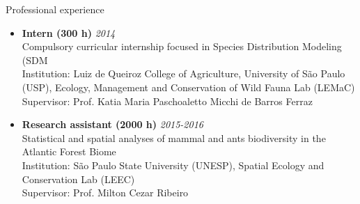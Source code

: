 \documentclass{resume}
\begin{document}

\begin{rSection}{Professional experience}
\begin{itemize}
\item {\bf Intern (300 h)} \hfill{\em 2014}\\
Compulsory curricular internship focused in Species Distribution Modeling (SDM\\
Institution: Luiz de Queiroz College of Agriculture, University of São Paulo (USP), Ecology, Management and Conservation of Wild Fauna Lab (LEMaC)\\
Supervisor: Prof. Katia Maria Paschoaletto Micchi de Barros Ferraz

\item {\bf Research assistant (2000 h)} \hfill{\em 2015-2016}\\
Statistical and spatial analyses of mammal and ants biodiversity in the Atlantic Forest Biome\\
Institution: São Paulo State University (UNESP), Spatial Ecology and Conservation Lab (LEEC)\\
Supervisor: Prof. Milton Cezar Ribeiro
\end{itemize}
\end{rSection}

\end{document}
